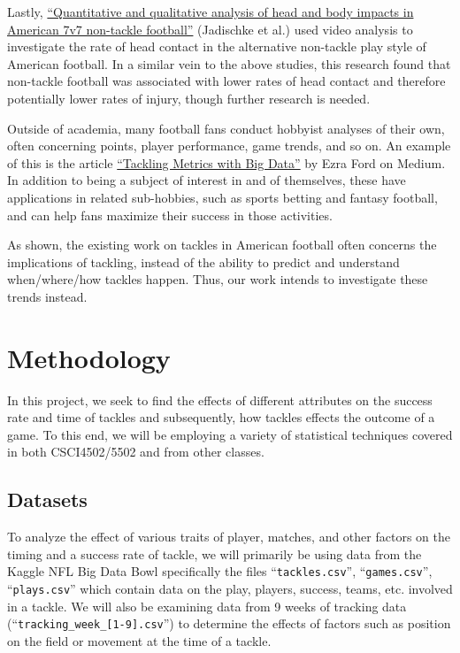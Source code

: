 \documentclass[bibtex, sigconf, hyperref={colorlinks=true,linkcolor=blue,urlcolor=blue}]{acmart}
\begin{document}
Lastly,
\href{https://bmjopensem.bmj.com/content/6/1/e000638.abstract}{“Quantitative and
qualitative analysis of head and body impacts in American 7v7 non-tackle
football”}\cite{quantitative} (Jadischke et al.) used video analysis to
investigate the rate of head contact in the alternative non-tackle play style of
American football. In a similar vein to the above studies, this research found
that non-tackle football was associated with lower rates of head contact and
therefore potentially lower rates of injury, though further research is needed.

Outside of academia, many football fans conduct hobbyist analyses of their own,
often concerning points, player performance, game trends, and so on. An example
of this is the article
\href{https://medium.com/@ezra.ford/tackling-metrics-with-big-data-0812b5ab65f0}{“Tackling
Metrics with Big Data”} by Ezra Ford on Medium. In addition to being a subject
of interest in and of themselves, these have applications in related
sub-hobbies, such as sports betting and fantasy football, and can help fans
maximize their success in those activities.

As shown, the existing work on tackles in American football often concerns the
implications of tackling, instead of the ability to predict and understand
when/where/how tackles happen.  Thus, our work intends to investigate these
trends instead.

\section{Methodology}

In this project, we seek to find the effects of different attributes on the
success rate and time of tackles and subsequently, how tackles effects the
outcome of a game.  To this end, we will be employing a variety of statistical
techniques covered in both CSCI4502/5502 and from other classes.

\subsection{Datasets}

To analyze the effect of various traits of player, matches, and other factors on
the timing and a success rate of tackle, we will primarily be using data from
the Kaggle NFL Big Data Bowl \cite{nflkaggle}
specifically the files ``\verb|tackles.csv|'', ``\verb|games.csv|'',
``\verb|plays.csv|'' which contain data on the play, players, success, teams,
etc. involved in a tackle.  We will also be examining data from 9 weeks of
tracking data (``\verb|tracking_week_[1-9].csv|'') to determine the effects of
factors such as position on the field or movement at the time of a tackle.
\end{document}
